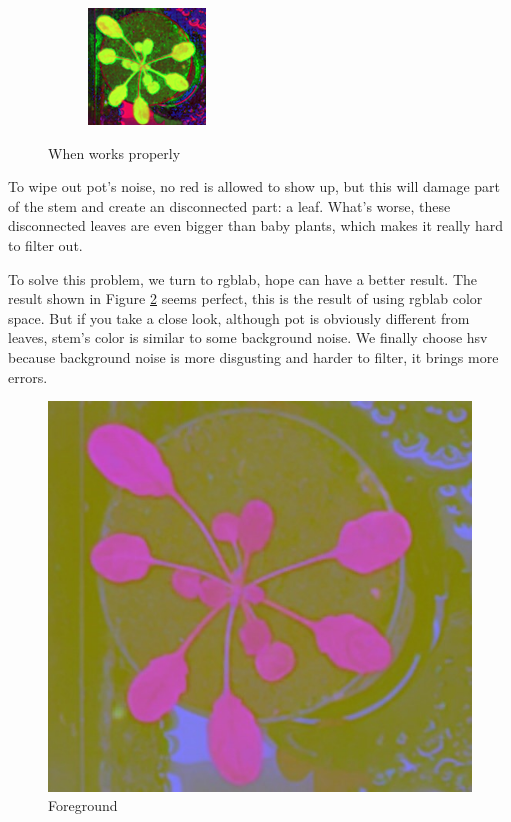 \documentclass[conference]{IEEEtran}
\begin{document}
\begin{figure}[h!]
\begin{subfigure}[h!]{0.24\textwidth}
    \includegraphics[width=\textwidth]{img/task1_good_class_enhanced.png}
\end{subfigure}
\caption{When works properly}
\label{fig:task1_good_eg}
\end{figure}
To wipe out pot’s noise, no red is allowed to show up, but this will damage part of the stem and create an disconnected part: a leaf. What’s worse, these disconnected leaves are even bigger than baby plants, which makes it really hard to filter out. 

To solve this problem, we turn to rgblab, hope can have a better result. The result shown in Figure \ref{task1_no_pot} seems perfect, this is the result of using rgblab color space. But if you take a close look, although pot is obviously different from leaves, stem’s color is similar to some background noise. We finally choose hsv because background noise is more disgusting and harder to filter, it brings more errors.

\begin{figure}[h!]
\centering
\includegraphics[width=0.7\linewidth]{img/task1_no_pot.jpg}
\caption{Foreground}
\label{task1_no_pot}
\end{figure}
\end{document}
